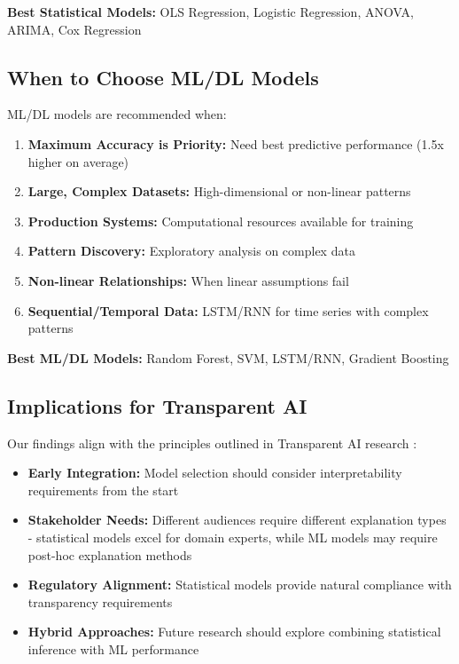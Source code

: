 \documentclass[11pt,a4paper]{article}
\begin{document}
\textbf{Best Statistical Models:} OLS Regression, Logistic Regression, ANOVA, ARIMA, Cox Regression

\subsection{When to Choose ML/DL Models}

ML/DL models are recommended when:

\begin{enumerate}
    \item \textbf{Maximum Accuracy is Priority:} Need best predictive performance (1.5x higher on average)
    \item \textbf{Large, Complex Datasets:} High-dimensional or non-linear patterns
    \item \textbf{Production Systems:} Computational resources available for training
    \item \textbf{Pattern Discovery:} Exploratory analysis on complex data
    \item \textbf{Non-linear Relationships:} When linear assumptions fail
    \item \textbf{Sequential/Temporal Data:} LSTM/RNN for time series with complex patterns
\end{enumerate}

\textbf{Best ML/DL Models:} Random Forest, SVM, LSTM/RNN, Gradient Boosting

\subsection{Implications for Transparent AI}

Our findings align with the principles outlined in Transparent AI research \cite{transparent_ai_2025}:

\begin{itemize}
    \item \textbf{Early Integration:} Model selection should consider interpretability requirements from the start
    \item \textbf{Stakeholder Needs:} Different audiences require different explanation types - statistical models excel for domain experts, while ML models may require post-hoc explanation methods
    \item \textbf{Regulatory Alignment:} Statistical models provide natural compliance with transparency requirements
    \item \textbf{Hybrid Approaches:} Future research should explore combining statistical inference with ML performance
\end{itemize}
\end{document}

